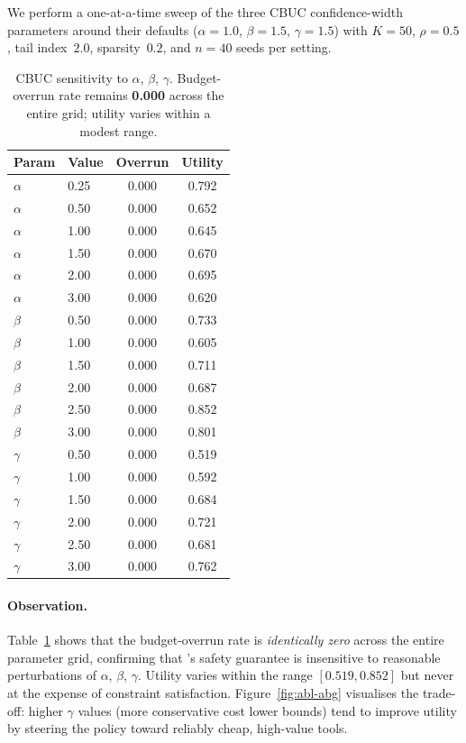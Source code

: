 We perform a one-at-a-time sweep of the three CBUC confidence-width
parameters around their defaults ($\alpha\!=\!1.0$, $\beta\!=\!1.5$,
$\gamma\!=\!1.5$) with $K\!=\!50$, $\rho\!=\!0.5$, tail index~$2.0$,
sparsity~$0.2$, and $n\!=\!40$ seeds per setting.

\begin{table}[t]
\centering
\caption{CBUC sensitivity to $\alpha$, $\beta$, $\gamma$.
Budget-overrun rate remains \textbf{0.000} across the entire grid;
utility varies within a modest range.}
\label{tab:abl-abg}
\begin{tabular}{llcc}
\toprule
Param & Value & Overrun & Utility \\
\midrule
$\alpha$ & 0.25 & 0.000 & 0.792 \\
$\alpha$ & 0.50 & 0.000 & 0.652 \\
$\alpha$ & 1.00 & 0.000 & 0.645 \\
$\alpha$ & 1.50 & 0.000 & 0.670 \\
$\alpha$ & 2.00 & 0.000 & 0.695 \\
$\alpha$ & 3.00 & 0.000 & 0.620 \\
\midrule
$\beta$  & 0.50 & 0.000 & 0.733 \\
$\beta$  & 1.00 & 0.000 & 0.605 \\
$\beta$  & 1.50 & 0.000 & 0.711 \\
$\beta$  & 2.00 & 0.000 & 0.687 \\
$\beta$  & 2.50 & 0.000 & 0.852 \\
$\beta$  & 3.00 & 0.000 & 0.801 \\
\midrule
$\gamma$ & 0.50 & 0.000 & 0.519 \\
$\gamma$ & 1.00 & 0.000 & 0.592 \\
$\gamma$ & 1.50 & 0.000 & 0.684 \\
$\gamma$ & 2.00 & 0.000 & 0.721 \\
$\gamma$ & 2.50 & 0.000 & 0.681 \\
$\gamma$ & 3.00 & 0.000 & 0.762 \\
\bottomrule
\end{tabular}
\end{table}

\paragraph{Observation.}
Table~\ref{tab:abl-abg} shows that the budget-overrun rate is
\emph{identically zero} across the entire parameter grid, confirming
that \CBUC's safety guarantee is insensitive to reasonable
perturbations of $\alpha$, $\beta$, $\gamma$. Utility varies within the
range $[0.519, 0.852]$ but never at the expense of constraint
satisfaction. Figure~\ref{fig:abl-abg} visualises the trade-off: higher
$\gamma$ values (more conservative cost lower bounds) tend to improve
utility by steering the policy toward reliably cheap, high-value tools.

